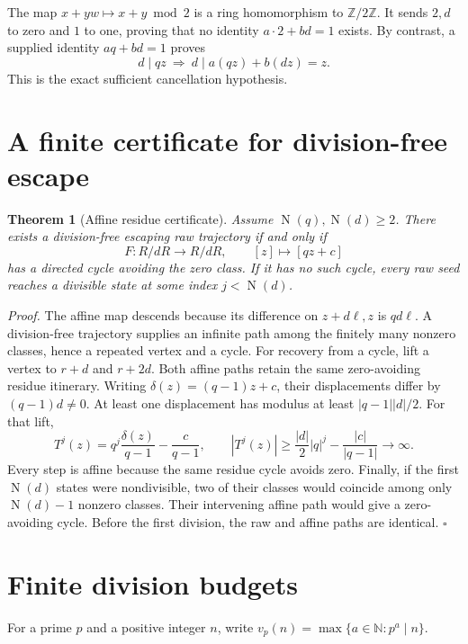 \documentclass[11pt,letterpaper]{article}
\newcommand{\N}{\mathbb{N}}
\newcommand{\Z}{\mathbb{Z}}
\newtheorem{theorem}{Theorem}
\newenvironment{proof}{\noindent\textit{Proof.}}{\hfill\(\square\)}
\newcommand{\OrderNorm}{\operatorname{N}}
\newcommand{\RawMap}{T}
\begin{document}
The map \(x+yw\mapsto x+y\bmod2\) is a ring homomorphism to \(\Z/2\Z\).
It sends \(2,d\) to zero and \(1\) to one, proving that no identity
\(a\cdot2+bd=1\) exists. By contrast, a supplied identity
\(aq+bd=1\) proves
\[
d\mid qz\ \Longrightarrow\
d\mid a(qz)+b(dz)=z.
\]
This is the exact sufficient cancellation hypothesis.

\section{A finite certificate for division-free escape}

\begin{theorem}[Affine residue certificate]
Assume \(\OrderNorm(q),\OrderNorm(d)\ge2\).
There exists a division-free escaping raw trajectory if and only if
\[
F:R/dR\longrightarrow R/dR,\qquad [z]\longmapsto[qz+c]
\]
has a directed cycle avoiding the zero class.
If it has no such cycle, every raw seed reaches a divisible state at
some index \(j<\OrderNorm(d)\).
\end{theorem}
\begin{proof}
The affine map descends because its difference on \(z+d\ell,z\) is
\(qd\ell\). A division-free trajectory supplies an infinite path among
the finitely many nonzero classes, hence a repeated vertex and a cycle.
For recovery from a cycle, lift a vertex to \(r+d\) and \(r+2d\).
Both affine paths retain the same zero-avoiding residue itinerary.
Writing \(\delta(z)=(q-1)z+c\), their displacements differ by
\((q-1)d\ne0\). At least one displacement has modulus at least
\(|q-1||d|/2\). For that lift,
\[
\RawMap^j(z)=q^j\frac{\delta(z)}{q-1}-\frac c{q-1},\qquad
|\RawMap^j(z)|\ge\frac{|d|}{2}|q|^j-\frac{|c|}{|q-1|}
\longrightarrow\infty.
\]
Every step is affine because the same residue cycle avoids zero.
Finally, if the first \(\OrderNorm(d)\) states were nondivisible,
two of their classes would coincide among only
\(\OrderNorm(d)-1\) nonzero classes. Their intervening affine path
would give a zero-avoiding cycle. Before the first division, the raw
and affine paths are identical.
\end{proof}

\section{Finite division budgets}

For a prime \(p\) and a positive integer \(n\), write
\(v_p(n)=\max\{a\in\N:p^a\mid n\}\).
\end{document}
